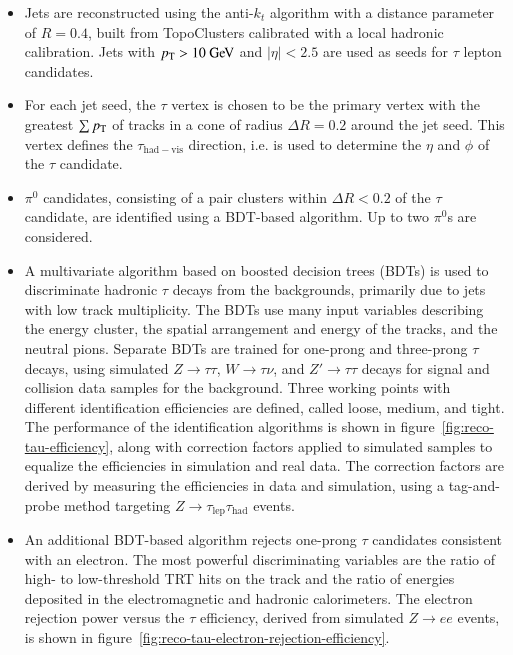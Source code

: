 \begin{itemize}
	\item Jets are reconstructed using the anti-$k_t$ algorithm with a distance parameter of $R=0.4$, built from TopoClusters calibrated with a local hadronic calibration. Jets with $\pt>10 \GeV$ and $|\eta|<2.5$ are used as seeds for $\tau$ lepton candidates.
	\item For each jet seed, the $\tau$ vertex is chosen to be the primary vertex with the greatest $\sum p_{\text{T}}$ of tracks in a cone of radius $\Delta R=0.2$ around the jet seed. This vertex defines the $\tau_{\mathrm{had-vis}}$ direction, i.e. is used to determine the $\eta$ and $\phi$ of the $\tau$ candidate. 
	\item $\pi^0$ candidates, consisting of a pair clusters within $\Delta R<0.2$ of the $\tau$ candidate, are identified using a BDT-based algorithm. Up to two $\pi^0$s are considered.
	\item A multivariate algorithm based on boosted decision trees (BDTs) is used to discriminate hadronic $\tau$ decays from the backgrounds, primarily due to jets with low track multiplicity. The BDTs use many input variables describing the energy cluster, the spatial arrangement and energy of the tracks, and the neutral pions. Separate BDTs are trained for one-prong and three-prong $\tau$ decays, using simulated $Z\rightarrow\tau\tau$, $W\rightarrow \tau\nu$, and $Z'\rightarrow\tau\tau$ decays for signal and collision data samples for the background. Three working points with different identification efficiencies are defined, called loose, medium, and tight. The performance of the identification algorithms is shown in figure~\ref{fig:reco-tau-efficiency}, along with correction factors applied to simulated samples to equalize the efficiencies in simulation and real data. The correction factors are derived by measuring the efficiencies in data and simulation, using a tag-and-probe method targeting $Z\rightarrow\tau_{\mathrm{lep}}\tau_{\mathrm{had}}$ events.
	\item An additional BDT-based algorithm rejects one-prong $\tau$ candidates consistent with an electron. The most powerful discriminating variables are the ratio of high- to low-threshold TRT hits on the track and the ratio of energies deposited in the electromagnetic and hadronic calorimeters. The electron rejection power versus the $\tau$ efficiency, derived from simulated $Z\rightarrow ee$ events, is shown in figure~\ref{fig:reco-tau-electron-rejection-efficiency}.  
\end{itemize}


